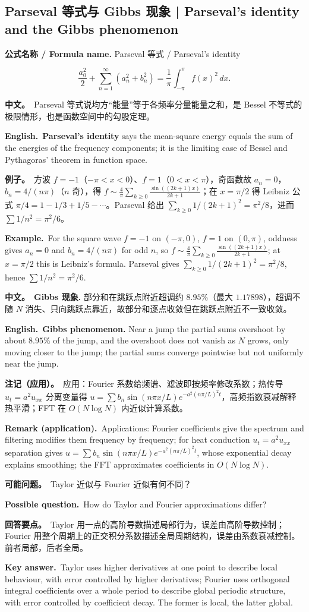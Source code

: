 \documentclass[UTF8,11pt,a4paper]{ctexart}
\newcommand{\BOTH}[2]{\par\noindent\textbf{中文。}\ #1\par\noindent\textbf{English.}\ #2\par}
\newcommand{\EX}[2]{\par\noindent\textbf{例子。}\ #1\par\noindent\textbf{Example.}\ #2\par}
\newcommand{\FORMULA}[2]{\par\noindent\textbf{公式名称 / Formula name.} #1 / #2\par}
\newcommand{\ASK}[4]{\begin{samepage}\par\noindent\textbf{可能问题。}\ #1\par\noindent\textbf{Possible question.}\ #2\par\noindent\textbf{回答要点。}\ #3\par\noindent\textbf{Key answer.}\ #4\medskip\end{samepage}}
\newcommand{\REMARK}[2]{\par\noindent\textbf{注记（应用）。}\ #1\par\noindent\textbf{Remark (application).}\ #2\par}
\begin{document}
\subsection{Parseval 等式与 Gibbs 现象 | Parseval's identity and the Gibbs phenomenon}
\FORMULA{Parseval 等式}{Parseval's identity}
\[
\frac{a_0^2}{2}+\sum_{n=1}^{\infty}(a_n^2+b_n^2)=\frac1\pi\int_{-\pi}^{\pi}f(x)^2\,dx .
\]
\BOTH{Parseval 等式说均方“能量”等于各频率分量能量之和，是 Bessel 不等式的极限情形，也是函数空间中的勾股定理。}{\textbf{Parseval's identity} says the mean-square energy equals the sum of the energies of the frequency components; it is the limiting case of Bessel and Pythagoras' theorem in function space.}
\EX{方波 $f=-1$（$-\pi<x<0$）、$f=1$（$0<x<\pi$），奇函数故 $a_n=0$，$b_n=4/(n\pi)$（$n$ 奇），得 $f\sim\frac4\pi\sum_{k\ge0}\frac{\sin((2k+1)x)}{2k+1}$；在 $x=\pi/2$ 得 Leibniz 公式 $\pi/4=1-1/3+1/5-\cdots$。Parseval 给出 $\sum_{k\ge0}1/(2k+1)^2=\pi^2/8$，进而 $\sum1/n^2=\pi^2/6$。}{For the square wave $f=-1$ on $(-\pi,0)$, $f=1$ on $(0,\pi)$, oddness gives $a_n=0$ and $b_n=4/(n\pi)$ for odd $n$, so $f\sim\frac4\pi\sum_{k\ge0}\frac{\sin((2k+1)x)}{2k+1}$; at $x=\pi/2$ this is Leibniz's formula. Parseval gives $\sum_{k\ge0}1/(2k+1)^2=\pi^2/8$, hence $\sum1/n^2=\pi^2/6$.}
\BOTH{\textbf{Gibbs 现象.} 部分和在跳跃点附近超调约 $8.95\%$（最大 $1.17898$），超调不随 $N$ 消失、只向跳跃点靠近，故部分和逐点收敛但在跳跃点附近不一致收敛。}{\textbf{Gibbs phenomenon.} Near a jump the partial sums overshoot by about $8.95\%$ of the jump, and the overshoot does not vanish as $N$ grows, only moving closer to the jump; the partial sums converge pointwise but not uniformly near the jump.}
\REMARK{应用：Fourier 系数给频谱、滤波即按频率修改系数；热传导 $u_t=a^2u_{xx}$ 分离变量得 $u=\sum b_n\sin(n\pi x/L)e^{-a^2(n\pi/L)^2t}$，高频指数衰减解释热平滑；FFT 在 $O(N\log N)$ 内近似计算系数。}{Applications: Fourier coefficients give the spectrum and filtering modifies them frequency by frequency; for heat conduction $u_t=a^2u_{xx}$ separation gives $u=\sum b_n\sin(n\pi x/L)e^{-a^2(n\pi/L)^2t}$, whose exponential decay explains smoothing; the FFT approximates coefficients in $O(N\log N)$.}
\ASK{Taylor 近似与 Fourier 近似有何不同？}{How do Taylor and Fourier approximations differ?}{Taylor 用一点的高阶导数描述局部行为，误差由高阶导数控制；Fourier 用整个周期上的正交积分系数描述全局周期结构，误差由系数衰减控制。前者局部，后者全局。}{Taylor uses higher derivatives at one point to describe local behaviour, with error controlled by higher derivatives; Fourier uses orthogonal integral coefficients over a whole period to describe global periodic structure, with error controlled by coefficient decay. The former is local, the latter global.}
\end{document}
